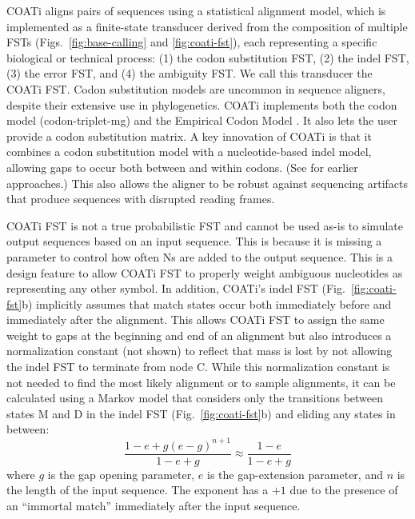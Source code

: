 \documentclass[12pt,letterpaper]{article}
\begin{document}
COATi aligns pairs of sequences using a statistical alignment model, which is implemented as a finite-state transducer derived from the composition of multiple FSTs (Figs.~\ref{fig:base-calling} and \ref{fig:coati-fst}), each representing a specific biological or technical process: (1) the codon substitution FST, (2) the indel FST, (3) the error FST, and (4) the ambiguity FST. We call this transducer the COATi FST. Codon substitution models are uncommon in sequence aligners, despite their extensive use in phylogenetics. COATi implements both the \cite{muse_gaut_1994} codon model (codon-triplet-mg) and the Empirical Codon Model \citep[codon-triplet-ecm;][]{kosiol_ECM_2007}.
It also lets the user provide a codon substitution matrix. A key innovation of COATi is that it combines a codon substitution model with a nucleotide-based indel model, allowing gaps to occur both between and within codons. (See \citealt{hein1994algorithm,arvestad1997aligning,pedersen1998comparison,ranwez_macse_2011,ranwez_macse_2018} for earlier approaches.) This also allows the aligner to be robust against sequencing artifacts that produce sequences with disrupted reading frames.

COATi FST is not a true probabilistic FST \citep{cotterell-etal-2014-stochastic} and cannot be used as-is to simulate output sequences based on an input sequence. This is because it is missing a parameter to control how often Ns are added to the output sequence. This is a design feature to allow COATi FST to properly weight ambiguous nucleotides as representing any other symbol. In addition, COATi's indel FST (Fig.~\ref{fig:coati-fst}b) implicitly assumes that match states occur both immediately before and immediately after the alignment. This allows COATi FST to assign the same weight to gaps at the beginning and end of an alignment but also introduces a normalization constant (not shown) to reflect that mass is lost by not allowing the indel FST to terminate from node C. While this normalization constant is not needed to find the most likely alignment or to sample alignments, it can be calculated using a Markov model that considers only the transitions between states M and D in the indel FST (Fig.~\ref{fig:coati-fst}b) and eliding any states in between:
\[
\frac{1-e + g(e-g)^{n+1}}{1-e+g} \approx \frac{1-e}{1-e+g} 
\]
where $g$ is the gap opening parameter, $e$ is the gap-extension parameter, and $n$ is the length of the input sequence. The exponent has a $+1$ due to the presence of an ``immortal match'' immediately after the input sequence.
\end{document}
